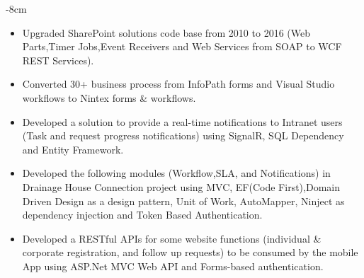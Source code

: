 \documentclass[10pt,a4paper]{altacv}
\begin{document}


\begin{adjustwidth}{}{-8cm}
\makecvheader
\end{adjustwidth}


\begin{itemize}

\item Upgraded SharePoint solutions code base from 2010 to 2016 (Web Parts,Timer Jobs,Event Receivers and Web Services from SOAP to WCF REST Services).
\item Converted 30+ business process from InfoPath forms and Visual Studio workflows to Nintex forms \& workflows.
\item Developed a solution to provide a real-time notifications to  Intranet users (Task and request progress notifications) using SignalR, SQL Dependency and Entity Framework. 
\item Developed the following modules (Workflow,SLA, and Notifications) in Drainage House Connection project using MVC, EF(Code First),Domain Driven Design as a design pattern, Unit of Work, AutoMapper, Ninject as dependency injection and Token Based Authentication. 
\end{itemize}

\divider

\begin{itemize}

\item Developed a RESTful APIs for some website functions (individual \& corporate registration, and follow up requests) to be consumed by the mobile App using ASP.Net MVC Web API and Forms-based authentication. 

\end{itemize}
\end{document}
